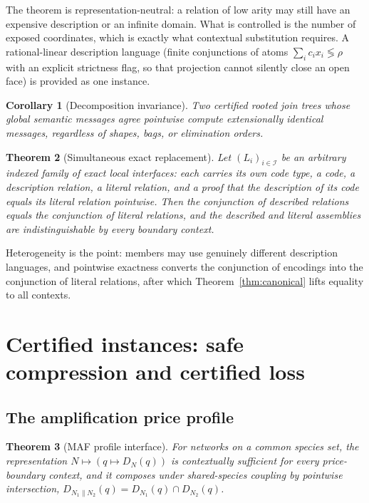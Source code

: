 \documentclass[11pt,a4paper]{article}
\theoremstyle{plain}
\newtheorem{theorem}{Theorem}[section]
\newtheorem{corollary}[theorem]{Corollary}
\theoremstyle{definition}
\theoremstyle{remark}
\begin{document}
The theorem is representation-neutral: a relation of low arity may still have an expensive description or an infinite domain. What is controlled is the number of exposed coordinates, which is exactly what contextual substitution requires. A rational-linear description language (finite conjunctions of atoms $\sum_i c_ix_i\lessgtr\rho$ with an explicit strictness flag, so that projection cannot silently close an open face) is provided as one instance.

\begin{corollary}[Decomposition invariance]\label{cor:decomp}
Two certified rooted join trees whose global semantic messages agree pointwise compute extensionally identical messages, regardless of shapes, bags, or elimination orders.
\end{corollary}

\begin{theorem}[Simultaneous exact replacement]\label{thm:replace}
Let $(L_i)_{i\in\mathcal I}$ be an arbitrary indexed family of \emph{exact local interfaces}: each carries its own code type, a code, a description relation, a literal relation, and a proof that the description of its code equals its literal relation pointwise. Then the conjunction of described relations equals the conjunction of literal relations, and the described and literal assemblies are indistinguishable by every boundary context.
\end{theorem}

Heterogeneity is the point: members may use genuinely different description languages, and pointwise exactness converts the conjunction of encodings into the conjunction of literal relations, after which Theorem~\ref{thm:canonical} lifts equality to all contexts.

\section{Certified instances: safe compression and certified loss}\label{sec:instances}

\subsection{The amplification price profile}

\begin{theorem}[MAF profile interface]\label{thm:maf-profile}
For networks on a common species set, the representation $N\mapsto(q\mapsto D_N(q))$ is contextually sufficient for every price-boundary context, and it composes under shared-species coupling by pointwise intersection, $D_{N_1\parallel N_2}(q)=D_{N_1}(q)\cap D_{N_2}(q)$.
\end{theorem}
\end{document}
